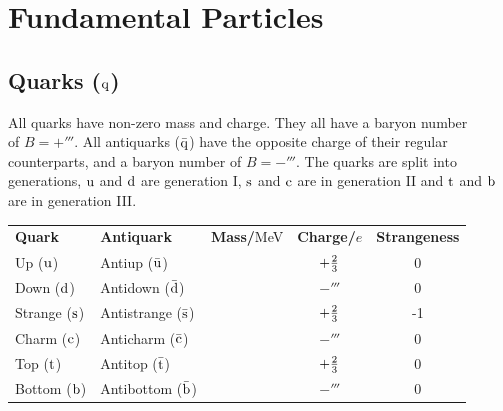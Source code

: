 \section{Fundamental Particles}
    \subsection{Quarks (\texorpdfstring{$\mathrm{q}$}.)}
        All quarks have non-zero mass and charge.
        They all have a baryon number \\ of $B=+\third$.
        All antiquarks ($\bar{\mathrm{q}}$) have the opposite charge of their regular counterparts, and a baryon number of $B=-\third$.
        The quarks are split into generations, $\mathrm{u}$ and $\mathrm{d}$ are generation I, $\mathrm{s}$ and $\mathrm{c}$ are in generation II and $\mathrm{t}$ and $\mathrm{b}$ are in generation III. \\

        \begin{center}
        \begin{tabular}{l l c c c}
            \textbf{Quark}            & \textbf{Antiquark}                & \textbf{Mass/}MeV & \textbf{Charge/}$e$ & \textbf{Strangeness} \\[0.4em]
            Up ($\mathrm{u}$)           & Antiup ($\bar{\mathrm{u}}$)           &                   & $+\frac{2}{3}$        & 0  \\[0.4em]
            Down ($\mathrm{d}$)       & Antidown ($\bar{\mathrm{d}}$)       &                   & $-\third$           & 0  \\[0.4em]
            Strange ($\mathrm{s}$) & Antistrange ($\bar{\mathrm{s}}$) &                   & $+\frac{2}{3}$        & -1 \\[0.4em]
            Charm ($\mathrm{c}$)     & Anticharm ($\bar{\mathrm{c}}$)     &                   & $-\third$           & 0  \\[0.4em]
            Top ($\mathrm{t}$)         & Antitop ($\bar{\mathrm{t}}$)         &                   & $+\frac{2}{3}$        & 0  \\[0.4em]
            Bottom ($\mathrm{b}$)   & Antibottom ($\bar{\mathrm{b}}$)   &                   & $-\third$           & 0
        \end{tabular}
        \end{center}

